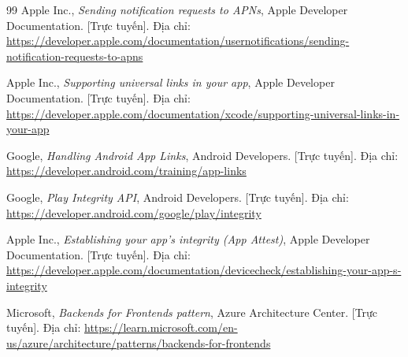 \begin{thebibliography}{99}
Apple Inc., \emph{Sending notification requests to APNs}, Apple Developer Documentation. [Trực tuyến]. Địa chỉ: \url{https://developer.apple.com/documentation/usernotifications/sending-notification-requests-to-apns}

Apple Inc., \emph{Supporting universal links in your app}, Apple Developer Documentation. [Trực tuyến]. Địa chỉ: \url{https://developer.apple.com/documentation/xcode/supporting-universal-links-in-your-app}

Google, \emph{Handling Android App Links}, Android Developers. [Trực tuyến]. Địa chỉ: \url{https://developer.android.com/training/app-links}

Google, \emph{Play Integrity API}, Android Developers. [Trực tuyến]. Địa chỉ: \url{https://developer.android.com/google/play/integrity}

Apple Inc., \emph{Establishing your app's integrity (App Attest)}, Apple Developer Documentation. [Trực tuyến]. Địa chỉ: \url{https://developer.apple.com/documentation/devicecheck/establishing-your-app-s-integrity}

Microsoft, \emph{Backends for Frontends pattern}, Azure Architecture Center. [Trực tuyến]. Địa chỉ: \url{https://learn.microsoft.com/en-us/azure/architecture/patterns/backends-for-frontends}

\end{thebibliography}
